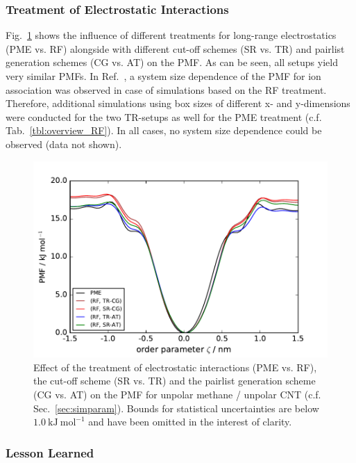 \documentclass[9pt,lessons]{livecoms}
\begin{document}
\subsubsection*{Treatment of Electrostatic Interactions}

Fig.~\ref{fig:UU_Meth_CNT_electrst} shows the influence of different treatments for long-range electrostatics (PME vs. RF) alongside with different cut-off schemes (SR vs. TR) and pairlist generation schemes 
(CG vs. AT) on the PMF. As can be seen, all setups yield very similar PMFs. 
In Ref.~, a system size dependence of the PMF for ion association was observed in case of simulations based on the RF treatment. 
Therefore, additional simulations using box sizes of different x- and y-dimensions were conducted for the two TR-setups as well for the PME treatment (c.f. Tab.~\ref{tbl:overview_RF}). 
In all cases, no system size dependence could be observed  (data not shown).

\begin{figure}[htb!]
\includegraphics[width=\linewidth]{figures/pmf_uCNT_uMeth_electrostatics.pdf}
\caption{Effect of the treatment of electrostatic interactions (PME vs. RF), the cut-off scheme (SR vs. TR) and the pairlist generation scheme (CG vs. AT)  on the PMF for unpolar methane / unpolar CNT 
(c.f. Sec.~\ref{sec:simparam}).
Bounds for statistical uncertainties are below $1.0~\mathrm{kJ}~\mathrm{mol}^{-1}$ and have been omitted in the interest of clarity.
}
\label{fig:UU_Meth_CNT_electrst}
\end{figure}

\subsubsection*{Lesson Learned}
\end{document}
